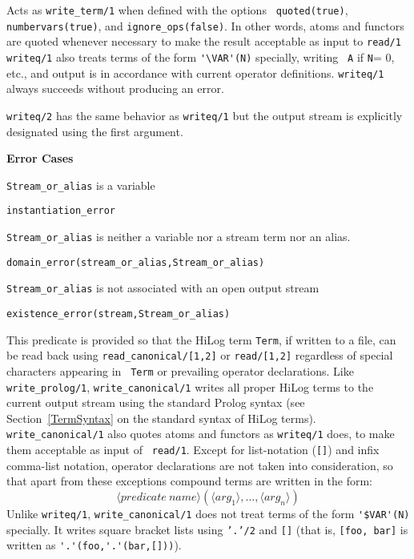 \begin{description}
%
Acts as {\tt write\_term/1} when defined with the options {\tt
  quoted(true)}, {\tt numbervars(true)}, and {\tt ignore\_ops(false)}.
In other words, atoms and functors are quoted whenever necessary to
make the result acceptable as input to {\tt read/1} {\tt writeq/1}
also treats terms of the form \verb|'\VAR'(N)| specially, writing {\tt
  A} if {\tt N}= 0, etc., and output is in accordance with current
operator definitions.  {\tt writeq/1} always succeeds without
producing an error.

%
	{\tt writeq/2} has the same behavior as {\tt writeq/1} but the
	output stream is explicitly designated using the first argument.

{\bf Error Cases} 
\bi
\item 	{\tt Stream\_or\_alias} is a variable
\bi
\item {\tt instantiation\_error}
\ei
\item 	{\tt Stream\_or\_alias} is neither a variable nor a stream term nor an alias.
\bi
\item 	{\tt domain\_error(stream\_or\_alias,Stream\_or\_alias)}
\ei
\item 	{\tt Stream\_or\_alias} is not associated with an open output stream
\bi
\item 	{\tt existence\_error(stream,Stream\_or\_alias)}
\ei
\ei

%
This predicate is provided so that the HiLog term {\tt Term}, if
written to a file, can be read back using {\tt read\_canonical/[1,2]}
or {\tt read/[1,2]} regardless of special characters appearing in {\tt
  Term} or prevailing operator declarations. Like {\tt
  write\_prolog/1}, {\tt write\_canonical/1} writes all proper HiLog
terms to the current output stream using the standard Prolog syntax
(see Section~\ref{TermSyntax} on the standard syntax of HiLog
terms). {\tt write\_canonical/1} also quotes atoms and functors as
{\tt writeq/1} does, to make them acceptable as input of {\tt
  read/1}\@.  Except for list-notation ({\tt []}) and infix comma-list
notation, operator declarations are not taken into consideration, so
that apart from these exceptions compound terms are written in the
form:
%
		\[ \langle predicate\ name \rangle
			(\langle arg_1 \rangle, \ldots,
			 \langle arg_n \rangle) \]
%
Unlike {\tt writeq/1}, {\tt write\_canonical/1} does not treat terms
of the form \verb|'$VAR'(N)| specially. It writes square bracket lists
using {\tt '.'/2} and {\tt []} (that is, {\tt [foo, bar]} is written
as \verb|'.'(foo,'.'(bar,[]))|).


\end{description}
